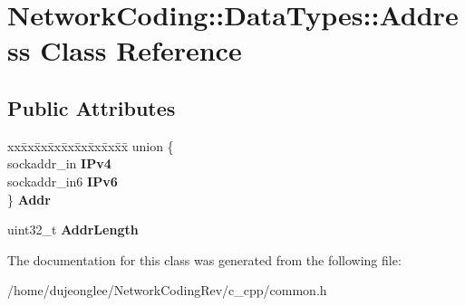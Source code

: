 \hypertarget{class_network_coding_1_1_data_types_1_1_address}{}\section{Network\+Coding\+:\+:Data\+Types\+:\+:Address Class Reference}
\label{class_network_coding_1_1_data_types_1_1_address}
\subsection*{Public Attributes}
\begin{DoxyCompactItemize}
\item 
\begin{tabbing}
xx\=xx\=xx\=xx\=xx\=xx\=xx\=xx\=xx\=\kill
union \{\\
\>sockaddr\_in {\bfseries IPv4}\\
\>sockaddr\_in6 {\bfseries IPv6}\\
\} {\bfseries Addr}\hypertarget{class_network_coding_1_1_data_types_1_1_address_a2cb008c1b10f958933b47e266fa7771b}{}\label{class_network_coding_1_1_data_types_1_1_address_a2cb008c1b10f958933b47e266fa7771b}
\\

\end{tabbing}\item 
uint32\+\_\+t {\bfseries Addr\+Length}\hypertarget{class_network_coding_1_1_data_types_1_1_address_a94a2597132535b608b249d1bf05aa950}{}\label{class_network_coding_1_1_data_types_1_1_address_a94a2597132535b608b249d1bf05aa950}

\end{DoxyCompactItemize}


The documentation for this class was generated from the following file\+:\begin{DoxyCompactItemize}
\item 
/home/dujeonglee/\+Network\+Coding\+Rev/c\+\_\+cpp/common.\+h\end{DoxyCompactItemize}
